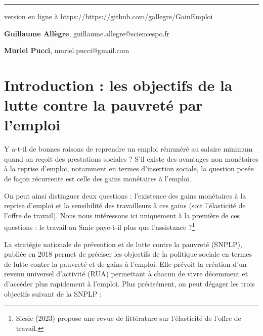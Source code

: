 \documentclass[
  french,
]{article}
\begin{document}
\begin{titlepage}
\par\rule{\textwidth}{0.5pt}


\vspace{1cm}


version en ligne à https://https://github.com/gallegre/GainEmploi


\vspace{1cm}

\begin{flushright}
   \linespread{1}\small{\textbf{Guillaume
Allègre}}, {\small{guillaume.allegre@sciencespo.fr}}\par
   \linespread{1}\small{\textbf{Muriel
Pucci}}, {\small{muriel.pucci@gmail.com}}\par
\end{flushright}
\end{titlepage}


\vspace{5cm}
\section{Introduction : les objectifs de la lutte contre la pauvreté par
l'emploi}\label{introduction-les-objectifs-de-la-lutte-contre-la-pauvretuxe9-par-lemploi}

Y a-t-il de bonnes raisons de reprendre un emploi rémunéré au salaire
minimum quand on reçoit des prestations sociales ? S'il existe des
avantages non monétaires à la reprise d'emploi, notamment en termes
d'insertion sociale, la question posée de façon récurrente est celle des
gains monétaires à l'emploi.

On peut ainsi distinguer deux questions : l'existence des gains
monétaires à la reprise d'emploi et la sensibilité des travailleurs à
ces gains (soit l'élasticité de l'offre de travail). Nous nous
intéressons ici uniquement à la première de ces questions : le travail
au Smic paye-t-il plus que l'assistance ?\footnote{Sicsic (2023) propose
  une revue de littérature sur l'élasticité de l'offre de travail.}

La stratégie nationale de prévention et de lutte contre la pauvreté
(SNPLP), publiée en 2018 permet de préciser les objectifs de la
politique sociale en termes de lutte contre la pauvreté et de gains à
l'emploi. Elle prévoit la création d'un revenu universel d'activité
(RUA) permettant à chacun de vivre décemment et d'accéder plus
rapidement à l'emploi. Plus précisément, on peut dégager les trois
objectifs suivant de la SNPLP :
\end{document}
